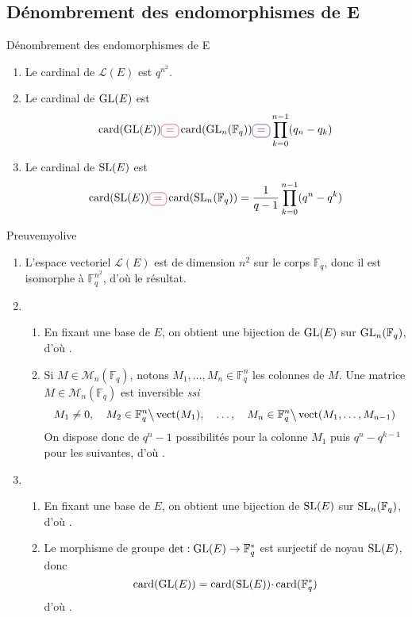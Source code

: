 \subsection{Dénombrement des endomorphismes de E}

    \begin{prop}{Dénombrement des endomorphismes de E}{}
        \begin{enumerate}
            \item Le cardinal de $\mathcal{L}(E)$ est $q^{n^2}$.
            \item Le cardinal de $\operatorname{GL}(E)$ est 
            \[ \card(\GL(E)) \lilbox{myred}{=} \card(\GL_n(\mathbb{F}_q)) \lilbox{mypurple}{=} \prod_{k=0}^{n-1} (q_n - q_k) \]
            \item Le cardinal de $\operatorname{SL}(E)$ est 
            \[ \card(\SL(E)) \lilbox{myred}{=} \card(\SL_n(\mathbb{F}_q)) = \frac{1}{q-1} \prod_{k=0}^{n-1} (q^n - q^k) \]
        \end{enumerate}
    \end{prop}

    \begin{demo}{Preuve}{myolive}
        \begin{enumerate}
            \item L’espace vectoriel $\mathcal{L}(E)$ est de dimension $n^2$ sur le corps $\mathbb{F}_q$, donc il est isomorphe à $\mathbb{F}_q^{n^2}$, d’où le résultat.
            \item \begin{enumerate}
                \item En fixant une base de $E$, on obtient une bijection de $\operatorname{GL}(E)$ sur $\operatorname{GL}_n(\mathbb{F}_q)$, d’où . 
                \item Si $M \in \mathcal{M}_n(\mathbb{F}_q)$, notons $M_1,\ldots,M_n \in \mathbb{F}_q^n$ les colonnes de $M$. Une matrice $M \in \mathcal{M}_n(\mathbb{F}_q)$ est inversible \textit{ssi} 
                \[ M_1 \neq 0, \quad  M_2 \in \mathbb{F}_q^n \big\backslash \operatorname{vect}(M_1), \quad \ldots, \quad M_n \in \mathbb{F}_q^n \big\backslash \operatorname{vect}(M_1,\ldots,M_{n-1}) \]
                On dispose donc de $q^n - 1$ possibilités pour la colonne $M_1$ puis $q^n - q^{k-1}$ pour les suivantes, d’où .
            \end{enumerate}
            \item \begin{enumerate}
                \item En fixant une base de $E$, on obtient une bijection de $\operatorname{SL}(E)$ sur $\operatorname{SL}_n(\mathbb{F}_q)$, d’où . 
                \item Le morphisme de groupe $\det : \operatorname{GL}(E) \to \mathbb{F}_q^*$ est surjectif de noyau $\operatorname{SL}(E)$, donc 
                \[ \operatorname{card}(\operatorname{GL}(E)) = \operatorname{card}(\operatorname{SL}(E)) \cdotp \operatorname{card}(\mathbb{F}_q^*) \]   
                d’où .
            \end{enumerate}
        \end{enumerate}
    \end{demo}

